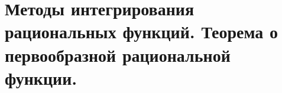 \documentclass[../main.tex]{subfiles}
\begin{document}
\newpage
\section{Методы интегрирования рациональных функций. Теорема о первообразной рациональной функции.}
\end{document}
